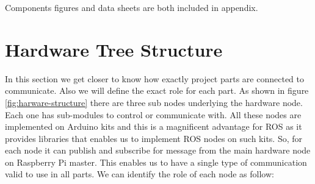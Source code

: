 \documentclass[12pt]{book}
\begin{document}
\noindent Components figures and data sheets are both included in appendix.





\section{Hardware Tree Structure}
In this section we get closer to know how exactly project parts are connected to communicate. Also we will define the exact role for each part. As shown in figure \ref{fig:harware-structure} there are three sub nodes underlying the hardware node. Each one has sub-modules to control or communicate with. All these nodes are implemented on Arduino kits and this is a magnificent advantage for ROS as it provides libraries that enables us to implement ROS nodes on such kits.\cite{205} So, for each node it can publish and subscribe for message from the main hardware node on Raspberry Pi master. This enables us to have a single type of communication valid to use in all parts. We can identify the role of each node as follow:
\end{document}
